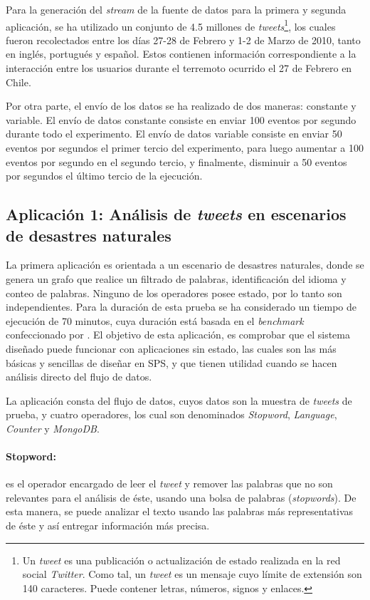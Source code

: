 Para la generaci\'on del \textit{stream} de la fuente de datos para la primera y segunda aplicaci\'on, se ha utilizado un conjunto de 4.5 millones de \textit{tweets}\footnote{Un \textit{tweet} es una publicaci\'on o actualizaci\'on de estado realizada en la red social \textit{Twitter}. Como tal, un \textit{tweet} es un mensaje cuyo l\'imite de extensi\'on son 140 caracteres. Puede contener letras, n\'umeros, signos y enlaces.}, los cuales fueron recolectados entre los d\'ias 27-28 de Febrero y 1-2 de Marzo de 2010, tanto en ingl\'es, portugu\'es y espa\~nol. Estos contienen informaci\'on correspondiente a la interacci\'on entre los usuarios durante el terremoto ocurrido el 27 de Febrero en Chile.

Por otra parte, el env\'io de los datos se ha realizado de dos maneras: constante y variable. El env\'io de datos constante consiste en enviar 100 eventos por segundo durante todo el experimento. El env\'io de datos variable consiste en enviar 50 eventos por segundos el primer tercio del experimento, para luego aumentar a 100 eventos por segundo en el segundo tercio, y finalmente, disminuir a 50 eventos por segundos el \'ultimo tercio de la ejecuci\'on.

\subsection{Aplicaci\'on 1: An\'alisis de \textit{tweets} en escenarios de desastres naturales}
La primera aplicaci\'on es orientada a un escenario de desastres naturales, donde se genera un grafo que realice un filtrado de palabras, identificaci\'on del idioma y conteo de palabras. Ninguno de los operadores posee estado, por lo tanto son independientes. Para la duraci\'on de esta prueba se ha considerado un tiempo de ejecuci\'on de 70 minutos, \normalsize{cuya duraci\'on est\'a basada en el \textit{benchmark} confeccionado por} \citep{ArasuCGMMRST04}. El objetivo de esta aplicaci\'on, es comprobar que el sistema dise\~nado puede funcionar con aplicaciones sin estado, las cuales son las m\'as b\'asicas y sencillas de dise\~nar en SPS, y que tienen utilidad cuando se hacen an\'alisis directo del flujo de datos.

La aplicaci\'on consta del flujo de datos, cuyos datos son la muestra de \textit{tweets} de prueba, y cuatro operadores, los cual son denominados \textit{Stopword}, \textit{Language}, \textit{Counter} y \textit{MongoDB}.

\paragraph{Stopword:} es el operador encargado de leer el \textit{tweet} y remover las palabras que no son relevantes para el an\'alisis de \'este, usando una bolsa de palabras (\textit{stopwords}). De esta manera, se puede analizar el texto usando las palabras m\'as representativas de \'este y as\'i entregar informaci\'on m\'as precisa.

